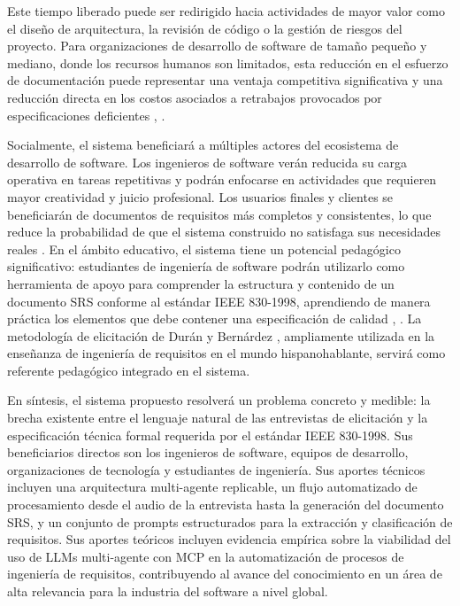 Este tiempo liberado puede ser redirigido hacia actividades de mayor valor como el diseño de arquitectura, la revisión de código o la gestión de riesgos del proyecto. Para organizaciones de desarrollo de software de tamaño pequeño y mediano, donde los recursos humanos son limitados, esta reducción en el esfuerzo de documentación puede representar una ventaja competitiva significativa y una reducción directa en los costos asociados a retrabajos provocados por especificaciones deficientes \cite{Wolf2026}, \cite{Umar2024}. 

Socialmente, el sistema beneficiará a múltiples actores del ecosistema de desarrollo de software. Los ingenieros de software verán reducida su carga operativa en tareas repetitivas y podrán enfocarse en actividades que requieren mayor creatividad y juicio profesional. Los usuarios finales y clientes se beneficiarán de documentos de requisitos más completos y consistentes, lo que reduce la probabilidad de que el sistema construido no satisfaga sus necesidades reales \cite{ieee1984ieee}. En el ámbito educativo, el sistema tiene un potencial pedagógico significativo: estudiantes de ingeniería de software podrán utilizarlo como herramienta de apoyo para comprender la estructura y contenido de un documento SRS conforme al estándar IEEE 830-1998, aprendiendo de manera práctica los elementos que debe contener una especificación de calidad \cite{doe2011recommended}, \cite{ieee1984ieee}. La metodología de elicitación de Durán y Bernárdez \cite{toro2000metodologia}, ampliamente utilizada en la enseñanza de ingeniería de requisitos en el mundo hispanohablante, servirá como referente pedagógico integrado en el sistema. 

En síntesis, el sistema propuesto resolverá un problema concreto y medible: la brecha existente entre el lenguaje natural de las entrevistas de elicitación y la especificación técnica formal requerida por el estándar IEEE 830-1998. Sus beneficiarios directos son los ingenieros de software, equipos de desarrollo, organizaciones de tecnología y estudiantes de ingeniería. Sus aportes técnicos incluyen una arquitectura multi-agente replicable, un flujo automatizado de procesamiento desde el audio de la entrevista hasta la generación del documento SRS, y un conjunto de prompts estructurados para la extracción y clasificación de requisitos. Sus aportes teóricos incluyen evidencia empírica sobre la viabilidad del uso de LLMs multi-agente con MCP en la automatización de procesos de ingeniería de requisitos, contribuyendo al avance del conocimiento en un área de alta relevancia para la industria del software a nivel global.